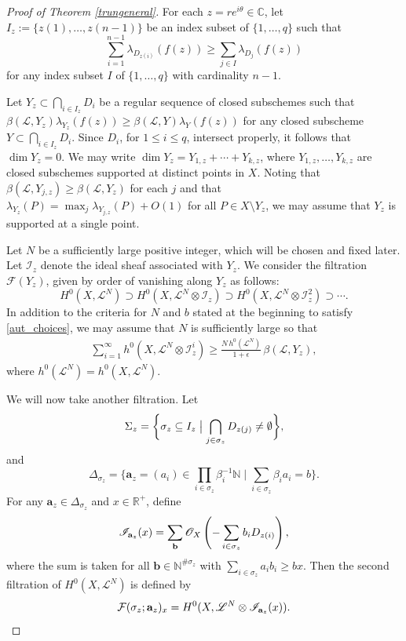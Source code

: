 \documentclass[10pt]{amsart}
\numberwithin{equation}{section}
\theoremstyle{plain}
\theoremstyle{definition}
\begin{document}
\begin{proof}[Proof of Theorem \ref{trungeneral}]


For each  $z=re^{i\theta}\in \mathbb C$, let $I_z:=\{z(1),\hdots,z(n-1)\}$ be an index subset of $\{1,\hdots,q\}$ such that 
$$
\sum_{i=1}^{n-1}\lambda_{D_{z(i)}}(f(z))\ge  \sum_{j\in I} \lambda_{D_{j}}(f(z)) 
$$
for any index subset $I$ of $\{1,\hdots,q\}$ with cardinality $n-1$.

Let $Y_z\subset \bigcap_{i\in I_z} D_i $ be a regular sequence of closed subschemes such that $\beta(\mathcal L, Y_z)\lambda_{Y_z}(f(z))\ge \beta(\mathcal L, Y)\lambda_{Y}(f(z))$ for any closed subscheme $Y \subset \bigcap_{i\in I_z} D_i$.
Since  $D_i$, for $1\le i\le q$, intersect properly,  it follows that $\dim Y_{z}=0$.  We may write $\dim Y_{z}=Y_{1,z}+\cdots+Y_{k,z}$, where $Y_{1,z},\hdots,Y_{k,z}$ are closed subschemes supported at distinct points in $X$.  Noting that  $\beta(\mathcal L, Y_{j,z})\ge \beta(\mathcal L, Y_{z})$ for each $j$ and that $\lambda_{Y_{z}}(P)=\max_j \lambda_{Y_{j,z}}(P)+O(1)$ for all $P\in X\setminus Y_{z}$, we may assume that $Y_{z}$ is supported at a single point.


Let $N$ be a sufficiently large positive integer, which will be chosen and fixed later. Let ${\mathscr I}_z$ denote the ideal sheaf associated with $Y_z$.
We consider the filtration $\mathcal{F}(Y_z)$,  given by order of vanishing along $Y_z$ as follows:
$$
H^0(X, {\mathscr L}^N)\supset H^0(X, {\mathscr L}^N\otimes {\mathscr I}_z )\supset H^0(X, {\mathscr L}^N\otimes {\mathscr I}_z^2 )\supset \cdots.
$$ 
In addition to the criteria for $N$ and $b$ stated at the beginning to satisfy \eqref{aut_choices}, we may assume that $N$ is sufficiently large so that
\begin{align}\label{filtrationbeta}
 \sum_{i=1}^{\infty} h^0(X, {\mathscr L}^N\otimes {\mathscr I}_z^i )
 \ge \frac{N\,h^0(\mathscr L^N)}{1+\epsilon}\, \beta({\mathscr L}, Y_z),
\end{align}
where $h^0(\mathscr L^N)=h^0(X,\mathscr L^N)$.



We will now take another filtration.
Let
$$\Sigma_z
  = \biggl\{\sigma_z\subseteq I_z  
    \bigm| \bigcap_{j\in \sigma_z}  D_{z(j)}\ne\emptyset\biggr\},
$$
and
$$\Delta_{\sigma_z}=\bigg\{\mathbf{a}_z=(a_i) \in \prod_{i \in \sigma_z}\beta_i^{-1}\mathbb{N}\mid \sum_{i \in \sigma_z}\beta_i a_i=b\bigg\}.$$
For any $\mathbf{a}_z \in \Delta_{\sigma_z}$ and $x \in \mathbb{R}^{+}$, define
$${\mathscr I}_{\mathbf{a}_z}(x)
  = \sum_{{\bf b}} {\mathscr O}_X\left(-\sum_{i\in \sigma_z} b_iD_{z(i)}\right),$$
where the sum is taken for all $\mathbf{b} \in \mathbb{N}^{\#\sigma_z}$ with $\sum_{i \in \sigma_z}a_ib_i \geq bx$. Then the second filtration of $H^0(X,\mathscr{L}^N)$ is defined by
$${\mathcal F}(\sigma_z; {\bf a}_z)_x
  = H^0(X, \mathscr L^N \otimes {{\mathscr I}_{\mathbf{a}_z}}(x)).$$



\end{proof}
\end{document}
